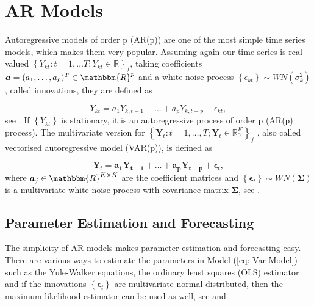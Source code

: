 \section{AR Models}
\label{sec: Ar Models}

Autoregressive models of order p (AR(p)) are one of the most simple time series models, which makes them very popular. Assuming again our time series is real-valued $\left\{Y_{kt}:t=1,\ldots T; Y_{kt} \in \mathbb{R}\right\}_f$, taking coefficients $\bm{a}=(a_1,\ldots,a_p)^T \in \mathbbm{R}^p$ and a white noise process $\left\{\epsilon_{kt}\right\} \sim WN(\sigma_k^2)$, called innovations, they are defined as 

\begin{equation}
Y_{kt} = a_1Y_{k,t-1} + \ldots + a_p Y_{k,t-p} + \epsilon_{kt},
\label{eq: Ar model}
\end{equation}
%
see \textcite{Scherrer:2021}. If $\left\{ Y_{kt} \right\}$ is stationary, it is an autoregressive process of order p (AR(p) process). The multivariate version for  $\left\{\bm{Y}_t:t=1,\ldots,T; \bm{Y}_t \in \mathbb{R}_0^K \right\}_f$ , also called vectorised autoregressive model (VAR(p)), is defined as 

\begin{equation}
\bm{Y}_{t} = \bm{a_1 Y_{t-1}}+ \ldots + \bm{a_p Y_{t-p}} + \bm{\epsilon}_{t},
\label{eq: Var Model}
\end{equation}
%
where $\bm{a}_j \in \mathbbm{R}^{K \times K}$ are the coefficient matrices and $\left\{\bm{\epsilon}_t \right\}\sim WN(\bm{\Sigma})$ is a multivariate white noise process with covariance matrix $\bm{\Sigma}$, see \textcite{Scherrer:2021}. %

\subsection{Parameter Estimation and Forecasting}
\label{sec: AR Estimation and Forecasting}

The simplicity of AR models makes parameter estimation and forecasting easy. There are various ways to estimate the parameters in Model (\ref{eq: Var Model}) such as the Yule-Walker equations, the ordinary least squares (OLS) estimator and if the innovations $\left\{\bm{\epsilon}_t\right\}$ are multivariate normal distributed, then the maximum likelihood estimator can be used as well, see \textcite{Scherrer:2021} and \textcite{Hamilton:1994}. %

